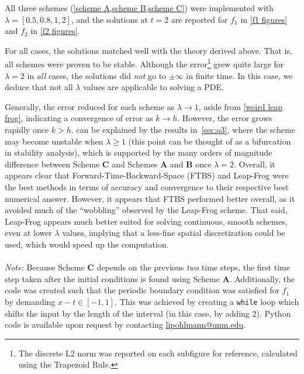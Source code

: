 All three schemes (\cref{scheme A,scheme B,scheme C}) were implemented with $\lambda = [0.5,0.8,1,2]$, and the solutions at $t=2$ are reported for $f_1$ in \cref{f1 figures} and $f_2$ in \cref{f2 figures}.

For all cases, the solutions matched well with the theory derived above. 
That is, all schemes were proven to be stable.
Although the error\footnote{The discrete L2 norm was reported on each subfigure for reference, calculated using the Trapezoid Rule.} grew quite large for $\lambda =2$ in \textit{all} cases, the solutions did \textit{not} go to $\pm \infty$ in finite time.
In this case, we deduce that not all $\lambda$ values are applicable to solving a PDE.

Generally, the error reduced for each scheme as $\lambda \rightarrow 1$, aside from \cref{weird leap frog}, indicating a convergence of error as $k\rightarrow h$.
However, the error grows rapidly once $k>h$.
 can be explained by the results in~\cref{sec:q3}, where the scheme may become unstable when $\lambda \geq 1$ (this point can be thought of as a bifurcation in stability analysis), which is supported by the many orders of magnitude difference between Scheme \textbf{C} and Schemes \textbf{A} and \textbf{B} once $\lambda =2$.
Overall, it appears clear that Forward-Time-Backward-Space (FTBS) and Leap-Frog were the best methods in terms of accuracy and convergence to their respective best numerical answer.
However, it appears that FTBS performed better overall, as it avoided much of the ``wobbling'' observed by the Leap-Frog scheme.
That said, Leap-Frog appears much better suited for solving continuous, smooth schemes, even at lower $\lambda$ values, implying that a less-fine spatial discretization could be used, which would speed up the computation.
\\ \\
\noindent \textit{Note:} Because Scheme \textbf{C} depends on the previous \textit{two} time steps, the first time step taken after the initial conditions is found using Scheme \textbf{A}.
Additionally, the code was created such that the periodic boundary condition was satisfied for $f_1$ by demanding $x-t\in [-1,1]$.
This was achieved by creating a \texttt{while} loop which shifts the input by the length of the interval (in this case, by adding 2).
Python code is available upon request by contacting \url{lipohlmann@unm.edu}.

